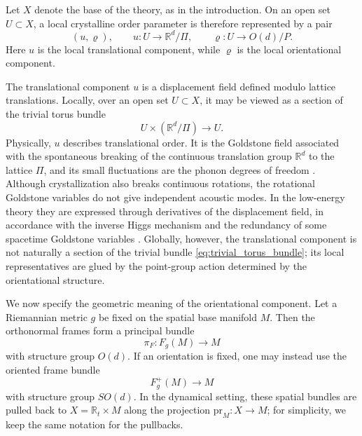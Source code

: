 \documentclass[11pt]{amsart}
\theoremstyle{plain}
\theoremstyle{definition}
\theoremstyle{remark}
\begin{document}
\medskip

Let \(X\) denote the base of the theory, as in the introduction. 
On an open set \(U\subset X\), a local crystalline order parameter is therefore represented by a pair
\begin{equation}
	(u,\varrho),
	\qquad
	u:U\to \mathbb R^d/\Pi,
	\qquad
	\varrho:U\to O(d)/P.
	\label{eq:local_order_parameter}
\end{equation}
Here \(u\) is the local translational component, while \(\varrho\) is the local orientational component.

The translational component \(u\) is a displacement field defined modulo lattice translations. 
Locally, over an open set \(U\subset X\), it may be viewed as a section of the trivial torus bundle
\begin{equation}
	U\times (\mathbb R^d/\Pi)\longrightarrow U.
	\label{eq:trivial_torus_bundle}
\end{equation}
Physically, \(u\) describes translational order. 
It is the Goldstone field associated with the spontaneous breaking of the continuous translation group \(\mathbb R^d\) to the lattice \(\Pi\), and its small fluctuations are the phonon degrees of freedom \cite{LeutwylerPhonons,WatanabeMurayama2013,AndersenBraunerHofmannVuorinen,HayataHidaka2014}. 
Although crystallization also breaks continuous rotations, the rotational Goldstone variables do not give independent acoustic modes. 
In the low-energy theory they are expressed through derivatives of the displacement field, in accordance with the inverse Higgs mechanism and the redundancy of some spacetime Goldstone variables \cite{IvanovOgievetsky1975,LowManohar,WatanabeMurayama2013,BraunerInverseHiggs}. 
Globally, however, the translational component is not naturally a section of the trivial bundle \eqref{eq:trivial_torus_bundle}; its local representatives are glued by the point-group action determined by the orientational structure.

\medskip

We now specify the geometric meaning of the orientational component. 
Let a Riemannian metric \(g\) be fixed on the spatial base manifold \(M\). 
Then the orthonormal frames form a principal bundle
\begin{equation}
	\pi_F:F_g(M)\longrightarrow M
	\label{eq:orthonormal_frame_bundle}
\end{equation}
with structure group \(O(d)\). 
If an orientation is fixed, one may instead use the oriented frame bundle
\begin{equation}
	F_g^+(M)\longrightarrow M
	\label{eq:oriented_frame_bundle}
\end{equation}
with structure group \(SO(d)\). 
In the dynamical setting, these spatial bundles are pulled back to \(X=\mathbb R_t\times M\) along the projection \(\mathrm{pr}_M:X\to M\); for simplicity, we keep the same notation for the pullbacks.
\end{document}
